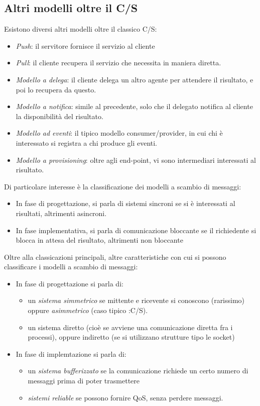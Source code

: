 \subsection{Altri modelli oltre il C/S}
Esistono diversi altri modelli oltre il classico C/S:
\begin{itemize}
 \item \textit{Push}: il servitore fornisce il servizio al cliente
 \item \textit{Pull}: il cliente recupera il servizio che necessita in maniera diretta.
 \item \textit{Modello a delega}: il cliente delega un altro agente per attendere il risultato, e poi lo recupera da
 questo.
 \item \textit{Modello a notifica}: simile al precedente, solo che il delegato notifica al cliente la disponibilità
 del risultato.
 \item \textit{Modello ad eventi}: il tipico modello consumer/provider, in cui chi è interessato si registra a chi
 produce gli eventi.
 \item \textit{Modello a provisioning}: oltre agli end-point, vi sono intermediari interessati al risultato.
\end{itemize}
Di particolare interesse è la classificazione dei modelli a scambio di messaggi:
\begin{itemize}
 \item In fase di progettazione, si parla di sistemi sincroni se si è interessati al risultati, altrimenti asincroni.
 \item In fase implementativa, si parla di comunicazione bloccante se il richiedente si blocca in attesa del risultato,
 altrimenti non bloccante
\end{itemize}
Oltre alla classicazioni principali, altre caratteristiche con cui si possono classificare i modelli a scambio di
messaggi:
\begin{itemize}
 \item In fase di progettazione si parla di:
 \begin{itemize}
  \item un \textit{sistema simmetrico} se mittente e ricevente si conoscono
  (rarissimo) oppure \textit{asimmetrico} (caso tipico :C/S).
  \item un sistema diretto (cioè se avviene una comunicazione diretta fra i
  processi), oppure indiretto (se si utilizzano strutture tipo le socket)
 \end{itemize}
 \item In fase di implemtazione si parla di:
 \begin{itemize}
  \item un \textit{sistema bufferizzato} se la comunicazione richiede un certo
  numero di messaggi prima di poter trasmettere
  \item \textit{sistemi reliable} se possono fornire QoS, senza perdere
  messaggi.
 \end{itemize}
\end{itemize}
